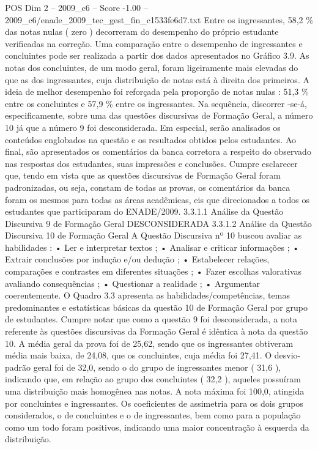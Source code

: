 \begin{textsample}{POS Dim 2 – 2009\_c6 – Score -1.00 – 2009\_c6/enade\_2009\_tec\_gest\_fin\_c1533fe6d7.txt}
Entre os ingressantes, 58,2 \% das notas nulas ( zero ) decorreram do desempenho do próprio estudante verificadas na correção.
Uma comparação entre o desempenho de ingressantes e concluintes pode ser realizada a partir dos dados apresentados no Gráfico 3.9.
As notas dos concluintes, de um modo geral, foram ligeiramente mais elevadas do que as dos ingressantes, cuja distribuição de notas está à direita dos primeiros.
A ideia de melhor desempenho foi reforçada pela proporção de notas nulas : 51,3 \% entre os concluintes e 57,9 \% entre os ingressantes.
Na sequência, discorrer -se-á, especificamente, sobre uma das questões discursivas de Formação Geral, a número 10 já que a número 9 foi desconsiderada.
Em especial, serão analisados os conteúdos englobados na questão e os resultados obtidos pelos estudantes.
Ao final, são apresentados os comentários da banca corretora a respeito do observado nas respostas dos estudantes, suas impressões e conclusões.
Cumpre esclarecer que, tendo em vista que as questões discursivas de Formação Geral foram padronizadas, ou seja, constam de todas as provas, os comentários da banca foram os mesmos para todas as áreas acadêmicas, eis que direcionados a todos os estudantes que participaram do ENADE/2009. 3.3.1.1 Análise da Questão Discursiva 9 de Formação Geral DESCONSIDERADA 3.3.1.2 Análise da Questão Discursiva 10 de Formação Geral A Questão Discursiva nº 10 buscou avaliar as habilidades : • Ler e interpretar textos ; • Analisar e criticar informações ; • Extrair conclusões por indução e/ou dedução ; • Estabelecer relações, comparações e contrastes em diferentes situações ; • Fazer escolhas valorativas avaliando consequências ; • Questionar a realidade ; • Argumentar coerentemente.
O Quadro 3.3 apresenta as habilidades/competências, temas predominantes e estatísticas básicas da questão 10 de Formação Geral por grupo de estudantes.
Cumpre notar que como a questão 9 foi desconsiderada, a nota referente às questões discursivas da Formação Geral é idêntica à nota da questão 10.
A média geral da prova foi de 25,62, sendo que os ingressantes obtiveram média mais baixa, de 24,08, que os concluintes, cuja média foi 27,41.
O desvio-padrão geral foi de 32,0, sendo o do grupo de ingressantes menor ( 31,6 ), indicando que, em relação ao grupo dos concluintes ( 32,2 ), aqueles possuíram uma distribuição mais homogênea nas notas.
A nota máxima foi 100,0, atingida por concluintes e ingressantes.
Os coeficientes de assimetria para os dois grupos considerados, o de concluintes e o de ingressantes, bem como para a população como um todo foram positivos, indicando uma maior concentração à esquerda da distribuição.

\end{textsample}

